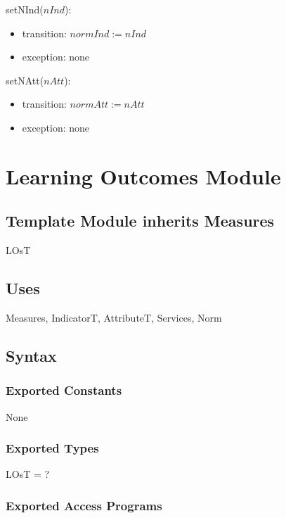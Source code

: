 \documentclass[12pt]{article}
\begin{document}
\noindent setNInd($\mathit{nInd}$):
\begin{itemize}
\item transition: $\mathit{normInd} := \mathit{nInd}$
\item exception: none
\end{itemize}

\noindent setNAtt($\mathit{nAtt}$):
\begin{itemize}
\item transition: $\mathit{normAtt} := \mathit{nAtt}$
\item exception: none
\end{itemize}

\newpage

\section* {Learning Outcomes Module}

\subsection*{Template Module inherits Measures}

LOsT

\subsection* {Uses}

Measures, IndicatorT, AttributeT, Services, Norm

\subsection* {Syntax}

\subsubsection* {Exported Constants}

None

\subsubsection* {Exported Types}

LOsT = ?

\subsubsection* {Exported Access Programs}
\end{document}
